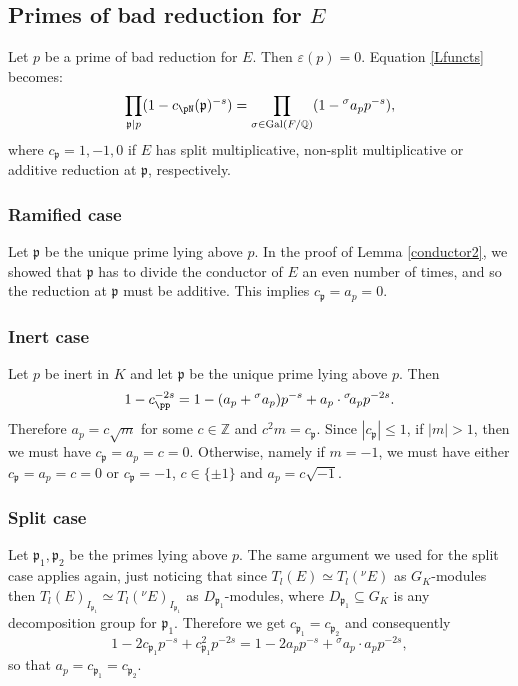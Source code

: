 \documentclass[11pt]{amsart}
\theoremstyle{definition}
\begin{document}
	  \subsection{Primes of bad reduction for \texorpdfstring{$E$}{}}

	Let $p$ be a prime of bad reduction for $E$. Then $\varepsilon(p)=0$. Equation \eqref{Lfuncts} becomes:
	  \begin{equation}\label{badred}
	    \prod_{{\mathfrak{p}}\mid p}(1-c_\pN({\mathfrak{p}})^{-s})=\prod_{\sigma\in\operatorname{Gal}(F/{\mathbb{Q}})}(1-{}^{\sigma}a_pp^{-s}),
	\end{equation}
	  where $c_{\mathfrak{p}}= 1,-1,0$ if $E$ has split multiplicative, non-split multiplicative or additive reduction at ${\mathfrak{p}}$, respectively.

	  \subsubsection*{Ramified case}
	  Let ${\mathfrak{p}}$ be the unique prime lying above $p$. In the proof of Lemma \ref{conductor2}, we showed that ${\mathfrak{p}}$ has to divide the conductor of $E$ an even number of times, and so the reduction at ${\mathfrak{p}}$ must be additive. This implies $c_{\mathfrak{p}}=a_p=0$.
	  \subsubsection*{Inert case}
	  Let $p$ be inert in $K$ and let ${\mathfrak{p}}$ be the unique prime lying above $p$. Then
	  $$1-c_\pp^{-2s}=1-(a_p+{}^{\sigma}a_p)p^{-s}+a_p\cdot {{}^\sigma\!} a_pp^{-2s}.$$
	  Therefore $a_p=c\sqrt{m}$ for some $c\in {\mathbb{Z}}$ and $c^2m=c_{\mathfrak{p}}$. Since $|c_{\mathfrak{p}}|\leq 1$, if $|m|>1$, then we must have $c_{\mathfrak{p}}=a_p=c=0$. Otherwise, namely if $m=-1$, we must have either $c_{\mathfrak{p}}=a_p=c=0$ or $c_{\mathfrak{p}}=-1$, $c\in\{\pm1\}$ and $a_p=c\sqrt{-1}$.
	  \subsubsection*{Split case}
	  Let ${\mathfrak{p}}_1,{\mathfrak{p}}_2$ be the primes lying above $p$. The same argument we used for the split case applies again, just noticing that since $T_l(E)\simeq T_l({{}^\nu\!} E)$ as $G_K$-modules then $T_l(E)_{I_{{\mathfrak{p}}_1}}\simeq T_l({{}^\nu\!} E)_{I_{{\mathfrak{p}}_1}}$ as $D_{{\mathfrak{p}}_1}$-modules, where $D_{{\mathfrak{p}}_1}{\subseteq} G_K$ is any decomposition group for ${\mathfrak{p}}_1$. Therefore we get $c_{{\mathfrak{p}}_1}=c_{{\mathfrak{p}}_2}$ and consequently
	  $$1-2c_{{\mathfrak{p}}_1}p^{-s}+c_{{\mathfrak{p}}_1}^2p^{-2s}=1-2a_pp^{-s}+{{}^\sigma\!} a_p\cdot a_pp^{-2s},$$
	  so that $a_p=c_{{\mathfrak{p}}_1}=c_{{\mathfrak{p}}_2}$.
\end{document}
